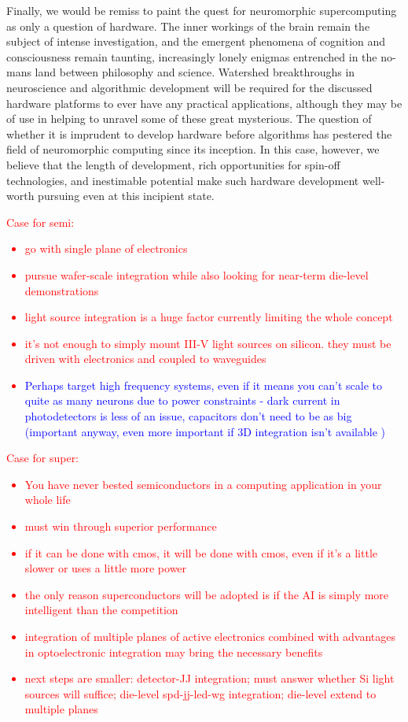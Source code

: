 \documentclass[twocolumn]{article}
\begin{document}
Finally, we would be remiss to paint the quest for neuromorphic supercomputing as only a question of hardware. The inner workings of the brain remain the subject of intense investigation, and the emergent phenomena of cognition and consciousness remain taunting, increasingly lonely enigmas entrenched in the no-mans land between philosophy and science. Watershed breakthroughs in neuroscience and algorithmic development will be required for the discussed hardware platforms to ever have any practical applications, although they may be of use in helping to unravel some of these great mysterious. The question of whether it is imprudent to develop hardware before algorithms has pestered the field of neuromorphic computing since its inception. In this case, however, we believe that the length of development, rich opportunities for spin-off technologies, and inestimable potential make such hardware development well-worth pursuing even at this incipient state.  

\textcolor{red}{Case for semi:
\begin{itemize}
    \item go with single plane of electronics
    \item pursue wafer-scale integration while also looking for near-term die-level demonstrations
    \item light source integration is a huge factor currently limiting the whole concept
    \item it's not enough to simply mount III-V light sources on silicon. they must be driven with electronics and coupled to waveguides
    \item \textcolor{blue}{Perhaps target high frequency systems, even if it means you can't scale to quite as many neurons due to power constraints - dark current in photodetectors is less of an issue, capacitors don't need to be as big (important anyway, even more important if 3D integration isn't available )}
\end{itemize}
}

\textcolor{red}{Case for super:
\begin{itemize}
    \item You have never bested semiconductors in a computing application in your whole life
    \item must win through superior performance
    \item if it can be done with cmos, it will be done with cmos, even if it's a little slower or uses a little more power
    \item the only reason superconductors will be adopted is if the AI is simply more intelligent than the competition
    \item integration of multiple planes of active electronics combined with advantages in optoelectronic integration may bring the necessary benefits
    \item next steps are smaller: detector-JJ integration; must answer whether Si light sources will suffice; die-level spd-jj-led-wg integration; die-level extend to multiple planes
\end{itemize}
}
\end{document}

